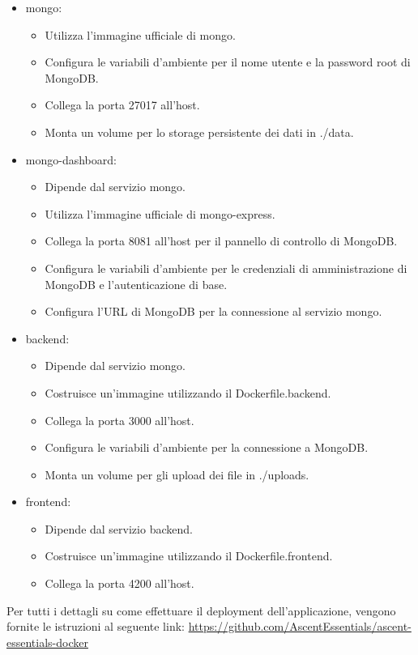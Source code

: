 \begin{itemize}
    \item mongo:
    \begin{itemize}
        \item Utilizza l'immagine ufficiale di mongo.
        \item Configura le variabili d'ambiente per il nome utente e la password root di MongoDB.
        \item Collega la porta 27017 all'host.
        \item Monta un volume per lo storage persistente dei dati in ./data.
    \end{itemize}
    \item mongo-dashboard:
    \begin{itemize}
        \item Dipende dal servizio mongo.
        \item Utilizza l'immagine ufficiale di mongo-express.
        \item Collega la porta 8081 all'host per il pannello di controllo di MongoDB.
        \item Configura le variabili d'ambiente per le credenziali di amministrazione di MongoDB e l'autenticazione di base.
        \item Configura l'URL di MongoDB per la connessione al servizio mongo.
    \end{itemize}
    \item backend:
    \begin{itemize}
        \item Dipende dal servizio mongo.
        \item Costruisce un'immagine utilizzando il Dockerfile.backend.
        \item Collega la porta 3000 all'host.
        \item Configura le variabili d'ambiente per la connessione a MongoDB.
        \item Monta un volume per gli upload dei file in ./uploads.
    \end{itemize}
    \item frontend:
    \begin{itemize}
        \item Dipende dal servizio backend.
        \item Costruisce un'immagine utilizzando il Dockerfile.frontend.
        \item Collega la porta 4200 all'host.
    \end{itemize}
\end{itemize}

Per tutti i dettagli su come effettuare il deployment dell'applicazione, vengono fornite le istruzioni al seguente link: \url{https://github.com/AscentEssentials/ascent-essentials-docker}
